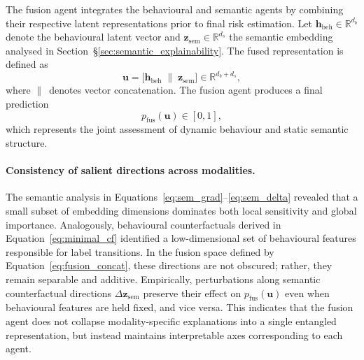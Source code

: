 \documentclass[lettersize,journal]{IEEEtran}
\begin{document}
The fusion agent integrates the behavioural and semantic agents by combining their respective latent representations prior to final risk estimation.
Let $\mathbf{h}_{\mathrm{beh}} \in \mathbb{R}^{d_b}$ denote the behavioural latent vector
and $\mathbf{z}_{\mathrm{sem}} \in \mathbb{R}^{d_s}$ the semantic embedding analysed in
Section~\S\ref{sec:semantic_explainability}.
The fused representation is defined as
\begin{equation}
\mathbf{u}
=
\big[
\mathbf{h}_{\mathrm{beh}} \;\|\; \mathbf{z}_{\mathrm{sem}}
\big]
\in \mathbb{R}^{d_b + d_s},
\label{eq:fusion_concat}
\end{equation}
where $\|\,$ denotes vector concatenation.
The fusion agent produces a final prediction
\begin{equation}
p_{\mathrm{fus}}(\mathbf{u}) \in [0,1],
\label{eq:fus_pred}
\end{equation}
which represents the joint assessment of dynamic behaviour and static semantic structure.

\vspace{0.3em}
\paragraph{Consistency of salient directions across modalities.}
The semantic analysis in Equations~\eqref{eq:sem_grad}--\eqref{eq:sem_delta} revealed that
a small subset of embedding dimensions dominates both local sensitivity and global
importance.
Analogously, behavioural counterfactuals derived in
Equation~\eqref{eq:minimal_cf} identified a low-dimensional set of behavioural features
responsible for label transitions.
In the fusion space defined by Equation~\eqref{eq:fusion_concat}, these directions are not
obscured; rather, they remain separable and additive.
Empirically, perturbations along semantic counterfactual directions
$\Delta \mathbf{z}_{\mathrm{sem}}$ preserve their effect on
$p_{\mathrm{fus}}(\mathbf{u})$ even when behavioural features are held fixed, and vice
versa.
This indicates that the fusion agent does not collapse modality-specific explanations into
a single entangled representation, but instead maintains interpretable axes corresponding
to each agent.

\vspace{0.3em}
\end{document}
